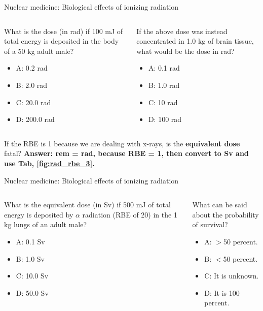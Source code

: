 \documentclass{beamer}
\begin{document}
\begin{frame}{Nuclear medicine: Biological effects of ionizing radiation}
\small
\begin{columns}[T]
\begin{column}{0.5\textwidth}
What is the dose (in rad) if 100 mJ of total energy is deposited in the body of a 50 kg adult male?
\begin{itemize}
\item A: 0.2 rad
\item B: 2.0 rad
\item C: 20.0 rad
\item D: 200.0 rad
\end{itemize}
\end{column}
\begin{column}{0.5\textwidth}
If the above dose was instead concentrated in 1.0 kg of brain tissue, what would be the dose in rad?
\begin{itemize}
\item A: 0.1 rad
\item B: 1.0 rad
\item C: 10 rad
\item D: 100 rad
\end{itemize}
\end{column}
\end{columns}
\vspace{0.5cm}
\footnotesize
If the RBE is 1 because we are dealing with x-rays, is the \textbf{equivalent dose} fatal? \alert{\textbf{Answer: rem = rad, because RBE = 1, then convert to Sv and use Tab, \ref{fig:rad_rbe_3}.}}
\end{frame}

\begin{frame}{Nuclear medicine: Biological effects of ionizing radiation}
\small
\begin{columns}[T]
\begin{column}{0.5\textwidth}
What is the equivalent dose (in Sv) if 500 mJ of total energy is deposited by $\alpha$ radiation (RBE of 20) in the 1 kg lungs of an adult male?
\begin{itemize}
\item A: 0.1 Sv
\item B: 1.0 Sv
\item C: 10.0 Sv
\item D: 50.0 Sv
\end{itemize}
\end{column}
\begin{column}{0.5\textwidth}
What can be said about the probability of survival?
\begin{itemize}
\item A: $>$50 percent.
\item B: $<$50 percent.
\item C: It is unknown.
\item D: It is 100 percent.
\end{itemize}
\end{column}
\end{columns}
\end{frame}
\end{document}
